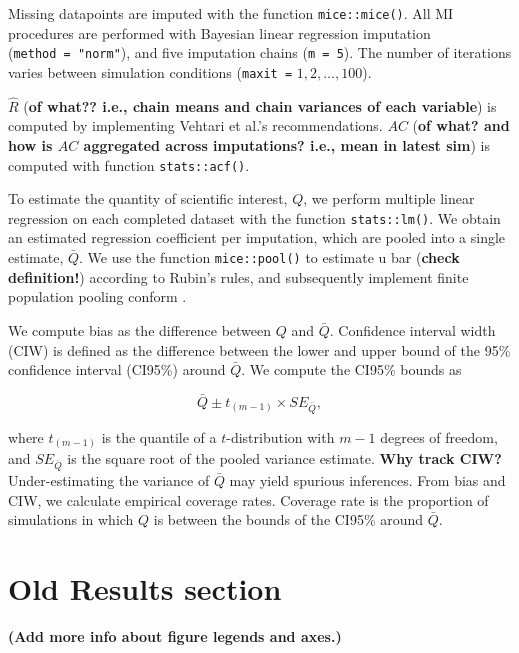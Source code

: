 \documentclass[Royal,times,sageh]{sagej}
\begin{document}
Missing datapoints are imputed with the function \texttt{mice::mice()}.
All MI procedures are performed with Bayesian linear regression
imputation (\texttt{method\ =\ "norm"}), and five imputation chains
(\texttt{m\ =\ 5}). The number of iterations varies between simulation
conditions (\texttt{maxit\ =} \(1, 2, \dots, 100\)).

\(\widehat{R}\) (\textbf{of what?? i.e., chain means and chain variances
of each variable}) is computed by implementing Vehtari et al.'s
\citeyearpar{veht19} recommendations. \(AC\) (\textbf{of what? and how
is \(AC\) aggregated across imputations? i.e., mean in latest sim}) is
computed with function \texttt{stats::acf()}.

To estimate the quantity of scientific interest, \(Q\), we perform
multiple linear regression on each completed dataset with the function
\texttt{stats::lm()}. We obtain an estimated regression coefficient per
imputation, which are pooled into a single estimate, \(\bar{Q}\). We use
the function \texttt{mice::pool()} to estimate u bar (\textbf{check
definition!}) according to Rubin's \citeyearpar{rubin87} rules, and
subsequently implement finite population pooling conform \citet{vink14}.

We compute bias as the difference between \(Q\) and \(\bar{Q}\).
Confidence interval width (CIW) is defined as the difference between the
lower and upper bound of the 95\% confidence interval (CI95\%) around
\(\bar{Q}\). We compute the CI95\% bounds as

\[\bar{Q} \pm t_{(m-1)} \times SE_{\bar{Q}},\]

where \(t_{(m-1)}\) is the quantile of a \(t\)-distribution with \(m-1\)
degrees of freedom, and \(SE_{\bar{Q}}\) is the square root of the
pooled variance estimate. \textbf{Why track CIW?} Under-estimating the
variance of \(\bar{Q}\) may yield spurious inferences. From bias and
CIW, we calculate empirical coverage rates. Coverage rate is the
proportion of simulations in which \(Q\) is between the bounds of the
CI95\% around \(\bar{Q}\).

\hypertarget{old-results-section}{%
\section{Old Results section}\label{old-results-section}}

\textbf{(Add more info about figure legends and axes.)}
\end{document}
